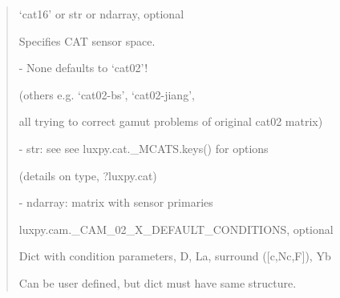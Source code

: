 \documentclass[letterpaper,10pt,english]{sphinxmanual}
\begin{document}
\begin{fulllineitems}
\begin{description}
\begin{quote}
\begin{description}
\item[{mcat}] \leavevmode
\begin{DUlineblock}{0em}
\item[] ‘cat16’ or str or ndarray, optional
\item[] Specifies CAT sensor space.
\item[]
\begin{DUlineblock}{\DUlineblockindent}
\item[] - None defaults to ‘cat02’!
\item[]
\begin{DUlineblock}{\DUlineblockindent}
\item[] (others e.g. ‘cat02-bs’, ‘cat02-jiang’,
\item[] all trying to correct gamut problems of original cat02 matrix)
\end{DUlineblock}
\item[] - str: see see luxpy.cat.\_MCATS.keys() for options 
\item[]
\begin{DUlineblock}{\DUlineblockindent}
\item[] (details on type, ?luxpy.cat)
\end{DUlineblock}
\item[] - ndarray: matrix with sensor primaries
\end{DUlineblock}
\end{DUlineblock}

\item[{condition}] \leavevmode
\begin{DUlineblock}{0em}
\item[] luxpy.cam.\_CAM\_02\_X\_DEFAULT\_CONDITIONS, optional
\item[] Dict with condition parameters, D, La, surround ({[}c,Nc,F{]}), Yb
\item[] Can be user defined, but dict must have same structure.
\end{DUlineblock}


\end{description}
\end{quote}
\end{description}
\end{fulllineitems}
\end{document}
